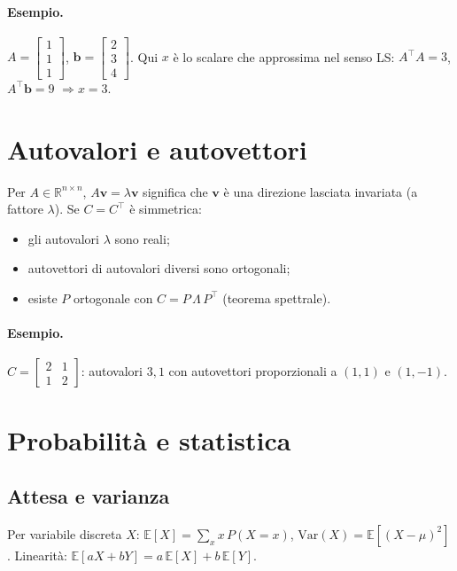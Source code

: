 \paragraph{Esempio.} \(A=\begin{bmatrix}1\\1\\1\end{bmatrix}\), \(\mathbf{b}=\begin{bmatrix}2\\3\\4\end{bmatrix}\). Qui \(x\) è lo scalare che approssima nel senso LS: \(A^\top A=3\), \(A^\top\mathbf{b}=9\) \(\Rightarrow x=3\).

\section{Autovalori e autovettori}\label{sec:eig}
Per \(A\in\mathbb{R}^{n\times n}\), \(A\mathbf{v}=\lambda\mathbf{v}\) significa che \(\mathbf{v}\) è una direzione lasciata invariata (a fattore \(\lambda\)). Se \(C=C^\top\) è simmetrica:
\begin{itemize}
  \item gli autovalori \(\lambda\) sono reali;
  \item autovettori di autovalori diversi sono ortogonali;
  \item esiste \(P\) ortogonale con \(C=P\,\Lambda\,P^\top\) (teorema spettrale).
\end{itemize}
\paragraph{Esempio.} \(C=\begin{bmatrix}2&1\\1&2\end{bmatrix}\): autovalori \(3,1\) con autovettori proporzionali a \((1,1)\) e \((1,-1)\).

\section{Probabilità e statistica}\label{sec:prob}
\subsection{Attesa e varianza}
Per variabile discreta \(X\): \(\mathbb{E}[X]=\sum_x x\,P(X=x)\), \(\mathrm{Var}(X)=\mathbb{E}[(X-\mu)^2]\). Linearità: \(\mathbb{E}[aX+bY]=a\,\mathbb{E}[X]+b\,\mathbb{E}[Y]\).
